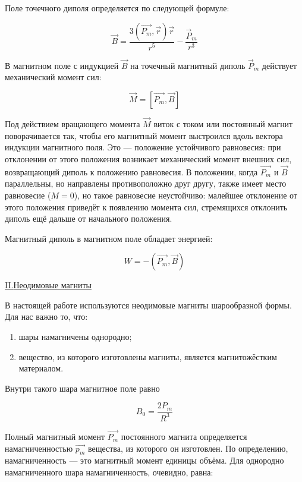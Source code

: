 \documentclass{article}
\begin{document}
Поле точечного диполя определяется по следующей формуле:

\begin{equation}
    \vec{B} = \dfrac{3\left(\vec{P_m}, \vec{r}\right)\vec{r}}{r^5} - \dfrac{\vec{P}_m}{r^3}
\end{equation}

В магнитном поле с индукцией $\vec{B}$ на точечный магнитный диполь $\vec{P}_m$ действует механический момент сил:

\begin{equation}
    \vec{M} = \left[\vec{P_m}, \vec{B}\right]
\end{equation}

Под действием вращающего момента $\vec{M}$ виток с током или постоянный магнит поворачивается так, чтобы его магнитный момент выстроился вдоль вектора индукции магнитного поля. Это --- положение устойчивого равновесия: при отклонении от этого положения возникает механический момент внешних сил, возвращающий диполь к положению равновесия. В положении, когда $\vec{P_m}$ и $\vec{B}$ параллельны, но направлены противоположно друг другу, также имеет место равновесие ($M = 0$), но такое равновесие неустойчиво: малейшее отклонение от этого положения приведёт к появлению момента сил, стремящихся отклонить диполь ещё дальше от начального положения.

Магнитный диполь в магнитном поле обладает энергией:

\begin{equation}
    W = -\left(\vec{P_m}, \vec{B}\right)
\end{equation}

\begin{center}
    \underline{\large {\RN{2}.{Неодимовые магниты}}}
\end{center}

В настоящей работе используются неодимовые магниты шарообразной формы.
Для нас важно то, что:
\begin{enumerate}
\item шары намагничены однородно;
\item вещество, из которого изготовлены магниты, является магнитожёстким материалом.
\end{enumerate}
Внутри такого шара магнитное поле равно 

\begin{equation}
    B_0 = \dfrac{2P_m}{R^3}
\end{equation}

Полный магнитный момент $\vec{P_m}$ постоянного магнита определяется намагниченностью $\vec{p_m}$ вещества, из которого он изготовлен. По определению, намагниченность --- это магнитный момент единицы объёма. Для однородно намагниченного шара намагниченность, очевидно, равна:
\end{document}
